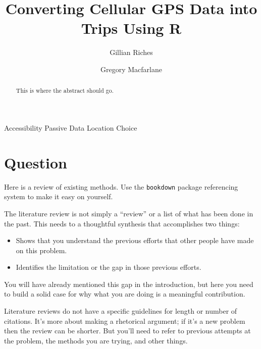 \documentclass[3p, authoryear]{elsarticle} %
\providecommand{\tightlist}{%
  \setlength{\itemsep}{0pt}\setlength{\parskip}{0pt}}
\begin{document}
\begin{frontmatter}

  \title{Converting Cellular GPS Data into Trips Using R}
    \author[Brigham Young University]{Gillian Riches}
    \author[Brigham Young University]{Gregory Macfarlane}
      \address[Brigham Young University]{Civil and Environmental Engineering Department, 430 Engineering Building, Provo, Utah 84602}
    \address[Another University]{Some Other Place}
  
  \begin{abstract}
  This is where the abstract should go.
  \end{abstract}
   \begin{keyword} Accessibility Passive Data Location Choice\end{keyword}
 \end{frontmatter}

\hypertarget{question}{%
\section{Question}\label{question}}

Here is a review of existing methods. Use the \texttt{bookdown} \citep{xie2015} package
referencing system to make it easy on yourself.

The literature review is not simply a ``review'' or a list of what has been
done in the past. This needs to a thoughtful synthesis that accomplishes two
things:

\begin{itemize}
\tightlist
\item
  Shows that you understand the previous efforts that other people have
  made on this problem.
\item
  Identifies the limitation or the gap in those previous efforts.
\end{itemize}

You will have already mentioned this gap in the introduction, but here you need
to build a solid case for why what you are doing is a meaningful contribution.

Literature reviews do not have a specific guidelines for length or number of
citations. It's more about making a rhetorical argument; if it's a new problem
then the review can be shorter. But you'll need to refer to previous attempts at
the problem, the methods you are trying, and other things.
\end{document}
